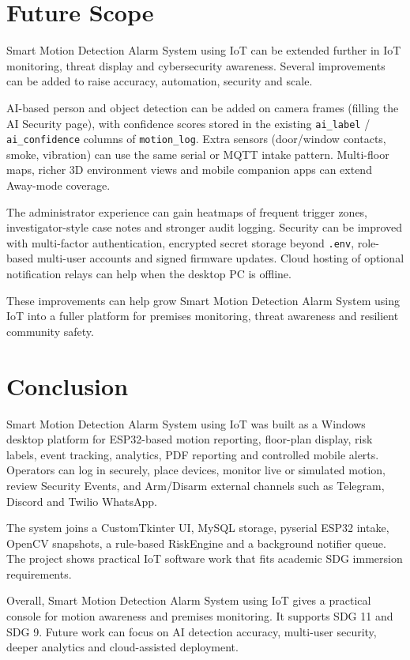 \documentclass[12pt,a4paper]{report}
\begin{document}
\section{Future Scope}

Smart Motion Detection Alarm System using IoT can be extended further in IoT monitoring, threat display and cybersecurity awareness. Several improvements can be added to raise accuracy, automation, security and scale.

AI-based person and object detection can be added on camera frames (filling the AI Security page), with confidence scores stored in the existing \texttt{ai\_label} / \texttt{ai\_confidence} columns of \texttt{motion\_log}. Extra sensors (door/window contacts, smoke, vibration) can use the same serial or MQTT intake pattern. Multi-floor maps, richer 3D environment views and mobile companion apps can extend Away-mode coverage.

The administrator experience can gain heatmaps of frequent trigger zones, investigator-style case notes and stronger audit logging. Security can be improved with multi-factor authentication, encrypted secret storage beyond \texttt{.env}, role-based multi-user accounts and signed firmware updates. Cloud hosting of optional notification relays can help when the desktop PC is offline.

These improvements can help grow Smart Motion Detection Alarm System using IoT into a fuller platform for premises monitoring, threat awareness and resilient community safety.

\section{Conclusion}

Smart Motion Detection Alarm System using IoT was built as a Windows desktop platform for ESP32-based motion reporting, floor-plan display, risk labels, event tracking, analytics, PDF reporting and controlled mobile alerts. Operators can log in securely, place devices, monitor live or simulated motion, review Security Events, and Arm/Disarm external channels such as Telegram, Discord and Twilio WhatsApp.

The system joins a CustomTkinter UI, MySQL storage, pyserial ESP32 intake, OpenCV snapshots, a rule-based RiskEngine and a background notifier queue. The project shows practical IoT software work that fits academic SDG immersion requirements.

Overall, Smart Motion Detection Alarm System using IoT gives a practical console for motion awareness and premises monitoring. It supports SDG 11 and SDG 9. Future work can focus on AI detection accuracy, multi-user security, deeper analytics and cloud-assisted deployment.
\end{document}
